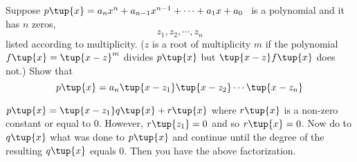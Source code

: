 \begin{enumialphparenastyle}
\begin{ex} Suppose $p\tup{x} =a_{n}x^{n}+a_{n-1}x^{n-1}+\cdots
+a_{1}x+a_{0}$ \ is a polynomial and it has $n$ zeros,
\begin{equation*}
z_{1},z_{2},\cdots ,z_{n}
\end{equation*}
listed according to multiplicity. ($z$ is a root of multiplicity $m$ if the
polynomial $f\tup{x} =\tup{x-z} ^{m}$ divides $p\tup{
x} $ but $\tup{x-z} f\tup{x} $ does not.) Show that
\begin{equation*}
p\tup{x} =a_{n}\tup{x-z_{1}} \tup{x-z_{2}} \cdots
\tup{x-z_{n}} 
\end{equation*} 
\begin{sol}
$p\tup{x} =\tup{x-z_{1}} q\tup{x} +r\tup{x} $
where $r\tup{x} $ is a non-zero constant or equal to $0$. However, $r\tup{z_{1}} =0$ and so $r\tup{x} =0$. Now do to $q\tup{
x} $ what was done to $p\tup{x} $ and continue until the
degree of the resulting $q\tup{x} $ equals $0$. Then you have the
above factorization.
\end{sol}
\end{ex}

\end{enumialphparenastyle}